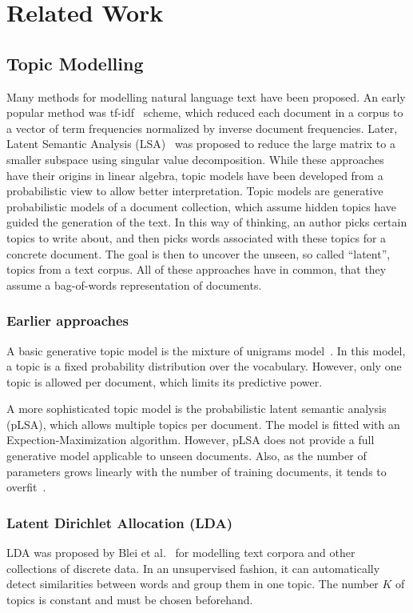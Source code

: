 \documentclass{sig-alternate-05-2015}
\begin{document}
\section{Related Work}
\label{sec:related-work}
\subsection{Topic Modelling}

Many methods for modelling natural language text have been proposed.
An early popular method was tf-idf~\cite{SparckJones1972} scheme, which reduced each document in a corpus to a vector of term frequencies normalized by inverse document frequencies.
Later, Latent Semantic Analysis (LSA)~\cite{Deerwester1990} was proposed to reduce the large matrix to a smaller subspace using singular value decomposition.
While these approaches have their origins in linear algebra, topic models have been developed from a probabilistic view to allow better interpretation.
Topic models are generative probabilistic models of a document collection, which assume hidden topics have guided the generation of the text.
In this way of thinking, an author picks certain topics to write about, and then picks words associated with these topics for a concrete document.
The goal is then to uncover the unseen, so called ``latent'', topics from a text corpus.
All of these approaches have in common, that they assume a bag-of-words representation of documents.

\subsubsection{Earlier approaches}
A basic generative topic model is the mixture of unigrams model~\cite{Nigam2000}.
In this model, a topic is a fixed probability distribution over the vocabulary.
However, only one topic is allowed per document, which limits its predictive power.

A more sophisticated topic model is the probabilistic latent semantic analysis (pLSA), which allows multiple topics per document.
The model is fitted with an Expection-Maximization algorithm.
However, pLSA does not provide a full generative model applicable to unseen documents.
Also, as the number of parameters grows linearly with the number of training documents, it tends to overfit~\cite{Blei2003}.

\subsubsection{Latent Dirichlet Allocation (LDA)}
LDA was proposed by Blei et al.~\cite{Blei2003} for modelling text corpora and other collections of discrete data.
In an unsupervised fashion, it can automatically detect similarities between words and group them in one topic.
The number $K$ of topics is constant and must be chosen beforehand.
\end{document}
